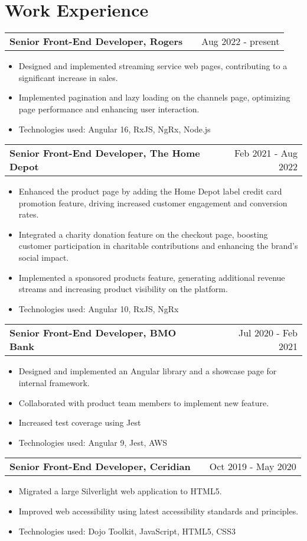 \documentclass[a4paper,12pt]{article}
\makeatletter
\newenvironment{joblong}[2]
    {
    \begin{tabularx}{\linewidth}{@{}l X r@{}}
    \textbf{#1} & \hfill &  #2 \\[3.75pt]
    \end{tabularx}
    \begin{minipage}[t]{\linewidth}
    \begin{itemize}[nosep,after=\strut, leftmargin=1em, itemsep=3pt,label=--]
    }
    {
    \end{itemize}
    \end{minipage}    
    }
\makeatother
\begin{document}
\section{Work Experience}

\begin{joblong}{Senior Front-End Developer, Rogers}{Aug 2022 - present}
\item Designed and implemented streaming service web pages, contributing to a significant increase in sales.
\item Implemented pagination and lazy loading on the channels page, optimizing page performance and enhancing user interaction.
\item Technologies used:  Angular 16, RxJS, NgRx, Node.js
\end{joblong}

\begin{joblong}{Senior Front-End Developer, The Home Depot}{Feb 2021 - Aug 2022}
\item Enhanced the product page by adding the Home Depot label credit card promotion feature, driving increased customer engagement and conversion rates.
\item Integrated a charity donation feature on the checkout page, boosting customer participation in charitable contributions and enhancing the brand's social impact. 
\item Implemented a sponsored products feature, generating additional revenue streams and increasing product visibility on the platform.
\item Technologies used:  Angular 10, RxJS, NgRx
\end{joblong}

\begin{joblong}{Senior Front-End Developer, BMO Bank}{Jul 2020 - Feb 2021}
\item Designed and implemented an Angular library and a showcase page for internal framework.
\item Collaborated with product team members to implement new feature.
\item Increased test coverage using Jest
\item Technologies used:  Angular 9, Jest, AWS
\end{joblong}

\begin{joblong}{Senior Front-End Developer, Ceridian}{Oct 2019 - May 2020}
\item Migrated a large Silverlight web application to HTML5.
\item Improved web accessibility using latest accessibility standards and principles. 
\item Technologies used:  Dojo Toolkit, JavaScript, HTML5, CSS3
\end{joblong}
\end{document}
